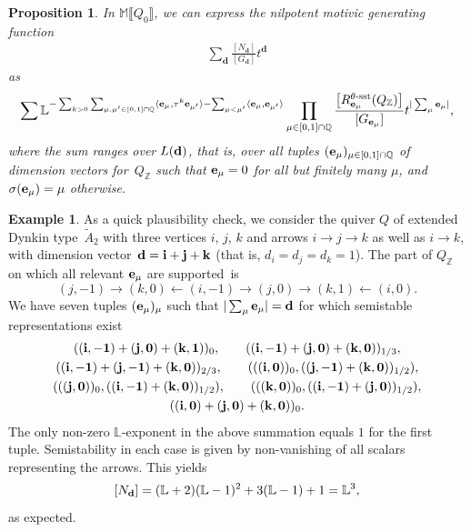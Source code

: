 \documentclass[pdftex]{sigma}
\numberwithin{equation}{section}
\newtheorem{Proposition}[Theorem]{Proposition}
\theoremstyle{definition}
\newtheorem{Example}[Theorem]{Example}
\begin{document}
\begin{Proposition} \label{prop iden}
In $\mathbb{M} \llbracket Q_0 \rrbracket$, we can express the nilpotent motivic generating function
\begin{align*}
\sum_{\mathbf{d}} \frac{[ N_{\mathbf{d}}]}{[G_{\mathbf{d}}]} t^{\mathbf{d}}
\end{align*}
as
\begin{align*}
 \sum
 \mathbb{L}^{ - \sum_{k > 0} \sum_{\mu, \mu' \in [0,1] \cap \mathbb{Q}} \langle\mathbf{e}_{\mu}, {\tau}^k \mathbf{e}_{\mu'}\rangle - \sum_{\mu < \mu'} \langle\mathbf{e}_{\mu}, \mathbf{e}_{\mu'}\rangle} \prod_{\mu \in [0,1] \cap \mathbb{Q}} \frac{\big[ R_{\mathbf{e}_\mu}^{\theta\text{\rm -sst}}(Q_{\mathbb{Z}}) \big]}{[ G_{\mathbf{e}_\mu}]} t^{|\sum_{\mu} \mathbf{e}_{\mu}|} ,
\end{align*}
where the sum ranges over $L({\bf d})$, that is, over all tuples $({\bf e}_\mu)_{\mu\in[0,1]\cap\mathbb{Q}}$ of dimension vectors for~$Q_\mathbb{Z}$ such that ${\bf e}_\mu=0$ for all but finitely many $\mu$, and $\sigma({\bf e}_\mu)=\mu$ otherwise.
\end{Proposition}

\begin{Example} As a quick plausibility check, we consider the quiver $Q$ of extended Dynkin type~$\tilde{A}_2$ with three vertices $i$, $j$, $k$ and arrows $i\rightarrow j\rightarrow k$ as well as $i\rightarrow k$, with dimension vector~${{\bf d}={\bf i}+{\bf j}+{\bf k}}$ (that is, $d_i=d_j=d_k=1$). The part of $Q_\mathbb{Z}$ on which all relevant ${\bf e}_\mu$ are supported~is
\[(j,-1)\rightarrow(k,0)\leftarrow(i,-1)\rightarrow(j,0)\rightarrow(k,1)\leftarrow(i,0).\]
We have seven tuples $({\bf e}_\mu)_\mu$ such that $|\sum_\mu{\bf e}_\mu|={\bf d}$ for which semistable representations exist
\begin{gather*}
 ({\bf(i,-1)}+{\bf(j,0)}+{\bf(k,1)})_0,\qquad
({\bf(i,-1)}+{\bf(j,0)}+{\bf(k,0)})_{1/3},\\
({\bf(i,-1)}+{\bf(j,-1)}+{\bf(k,0)})_{2/3},\qquad
(({\bf(i,0)})_0,({\bf(j,-1)}+{\bf(k,0)})_{1/2}),\\
(({\bf(j,0)})_0,({\bf(i,-1)}+{\bf(k,0)})_{1/2}),\qquad
(({\bf(k,0)})_0,({\bf(i,-1)}+{\bf(j,0)})_{1/2}),\\
({\bf(i,0)}+{\bf(j,0)}+{\bf(k,0)})_0.\end{gather*}
The only non-zero $\mathbb{L}$-exponent in the above summation equals $1$ for the first tuple. Semistability in each case is given by non-vanishing of all scalars representing the arrows. This yields
\[[N_{\bf d}]=(\mathbb{L}+2)(\mathbb{L}-1)^2+3(\mathbb{L}-1)+1=\mathbb{L}^3,\]
as expected.
\end{Example}
\end{document}

